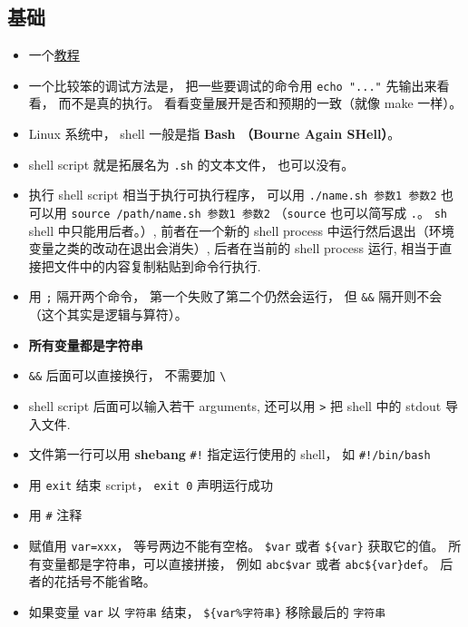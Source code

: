 
\begin{issues}
\issueDraft
\end{issues}


\subsection{基础}
\begin{itemize}
\item 一个\href{https://tldp.org/LDP/abs/html/why-shell.html}{教程}
\item 一个比较笨的调试方法是， 把一些要调试的命令用 \verb|echo "..."| 先输出来看看， 而不是真的执行。 看看变量展开是否和预期的一致（就像 make 一样）。
\item Linux 系统中， shell 一般是指 \textbf{Bash （Bourne Again SHell）}。
\item shell script 就是拓展名为 \verb`.sh` 的文本文件， 也可以没有。
\item 执行 shell script 相当于执行可执行程序， 可以用 \verb`./name.sh 参数1 参数2` 也可以用 \verb`source /path/name.sh 参数1 参数2` （\verb|source| 也可以简写成 \verb|.|。 \verb|sh| shell 中只能用后者。）, 前者在一个新的 shell process 中运行然后退出（环境变量之类的改动在退出会消失）, 后者在当前的 shell process 运行, 相当于直接把文件中的内容复制粘贴到命令行执行.
\item 用 \verb|;| 隔开两个命令， 第一个失败了第二个仍然会运行， 但 \verb|&&| 隔开则不会（这个其实是逻辑与算符）。
\item \textbf{所有变量都是字符串}
\item \verb|&&| 后面可以直接换行， 不需要加 \verb|\|
\item shell script 后面可以输入若干 arguments, 还可以用 \verb`>` 把 shell 中的 stdout 导入文件.
\item 文件第一行可以用 \textbf{shebang} \verb`#!` 指定运行使用的 shell， 如 \verb`#!/bin/bash`
\item 用 \verb|exit| 结束 script， \verb`exit 0` 声明运行成功
\item 用 \verb`#` 注释
\item 赋值用 \verb`var=xxx`， 等号两边不能有空格。 \verb|$var| 或者 \verb|${var}| 获取它的值。 所有变量都是字符串，可以直接拼接， 例如 \verb|abc$var| 或者 \verb|abc${var}def|。 后者的花括号不能省略。
\item 如果变量 \verb|var| 以 \verb|字符串| 结束， \verb|${var%字符串}| 移除最后的 \verb|字符串|

\end{itemize}
